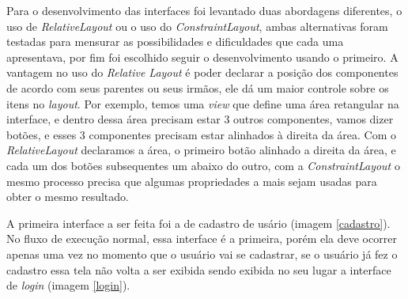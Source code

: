\documentclass[hidelinks,12pt]{article}
\begin{document}
Para o desenvolvimento das interfaces foi levantado duas abordagens diferentes, o uso de \textit{RelativeLayout} ou o uso do \textit{ConstraintLayout}, ambas alternativas foram testadas para mensurar as possibilidades e dificuldades que cada uma apresentava, por fim foi escolhido seguir o desenvolvimento usando o primeiro. A vantagem no uso do \textit{Relative Layout} \'e poder declarar a posi\c{c}\~ao dos componentes de acordo com seus parentes ou seus irm\~aos, ele d\'a um maior controle sobre os itens no \textit{layout}. Por exemplo, temos uma \textit{view} que define uma \'area retangular na interface, e dentro dessa \'area precisam estar 3 outros componentes, vamos dizer bot\~oes, e esses 3 componentes precisam estar alinhados à direita da \'area. Com o \textit{RelativeLayout} declaramos a \'area, o primeiro bot\~ao alinhado a direita da \'area, e cada um dos bot\~oes subsequentes um abaixo do outro, com a \textit{ConstraintLayout} o mesmo processo precisa que algumas propriedades a mais sejam usadas para obter o mesmo resultado.

A primeira interface a ser feita foi a de cadastro de us\'ario (imagem \ref{cadastro}). No fluxo de execu\c{c}\~ao normal, essa interface \'e a primeira, por\'em ela deve ocorrer apenas uma vez no momento que o usu\'ario vai se cadastrar, se o usu\'ario j\'a fez o cadastro essa tela n\~ao volta a ser exibida sendo exibida no seu lugar a interface de \textit{login} (imagem \ref{login}).
\end{document}
